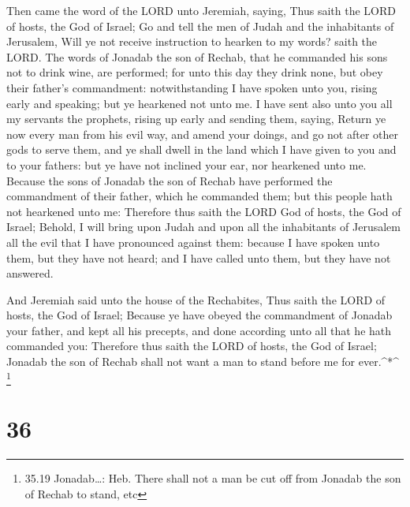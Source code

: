  Then came the word of the LORD unto Jeremiah, saying,
 Thus saith the LORD of hosts, the God of Israel; Go and
tell the men of Judah and the inhabitants of Jerusalem, Will ye not
receive instruction to hearken to my words? saith the LORD.
 The words of Jonadab the son of Rechab, that he commanded
his sons not to drink wine, are performed; for unto this day they drink
none, but obey their father's commandment: notwithstanding I have spoken
unto you, rising early and speaking; but ye hearkened not unto me.
 I have sent also unto you all my servants the prophets,
rising up early and sending them, saying, Return ye now every man from
his evil way, and amend your doings, and go not after other gods to
serve them, and ye shall dwell in the land which I have given to you and
to your fathers: but ye have not inclined your ear, nor hearkened unto
me.  Because the sons of Jonadab the son of Rechab have
performed the commandment of their father, which he commanded them; but
this people hath not hearkened unto me:  Therefore thus
saith the LORD God of hosts, the God of Israel; Behold, I will bring
upon Judah and upon all the inhabitants of Jerusalem all the evil that I
have pronounced against them: because I have spoken unto them, but they
have not heard; and I have called unto them, but they have not answered.

 And Jeremiah said unto the house of the Rechabites, Thus
saith the LORD of hosts, the God of Israel; Because ye have obeyed the
commandment of Jonadab your father, and kept all his precepts, and done
according unto all that he hath commanded you:  Therefore
thus saith the LORD of hosts, the God of Israel; Jonadab the son of
Rechab shall not want a man to stand before me for ever.\^{}*\^{}
\footnote{35.19 Jonadab\ldots: Heb. There shall not a man be cut off
  from Jonadab the son of Rechab to stand, etc}

\hypertarget{section-35}{%
\section{36}\label{section-35}}


